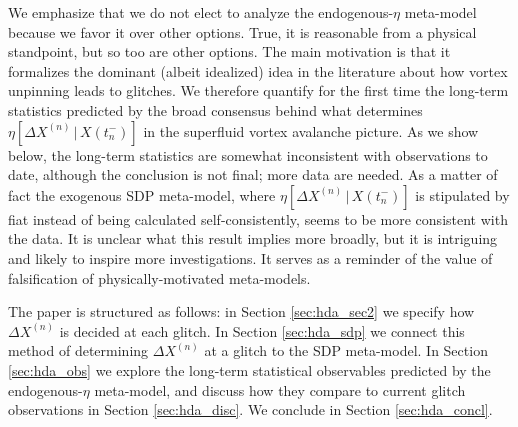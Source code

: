 We emphasize that we do not elect to analyze the endogenous-$\eta$ meta-model because we favor it over other options. True, it is reasonable from a physical standpoint, but so too are other options. The main motivation is that it formalizes the dominant (albeit idealized) idea in the literature about how vortex unpinning leads to glitches. We therefore quantify for the first time the long-term statistics predicted by the broad consensus behind what determines $\eta[\Delta X^{(n)}\,|\,X(t_{n}^-)]$ in the superfluid vortex avalanche picture. As we show below, the long-term statistics are somewhat inconsistent with observations to date, although the conclusion is not final; more data are needed. As a matter of fact the exogenous SDP meta-model, where $\eta[\Delta X^{(n)}\,|\,X(t_{n}^-)]$ is stipulated by fiat instead of being calculated self-consistently, seems to be more consistent with the data. It is unclear what this result implies more broadly, but it is intriguing and likely to inspire more investigations. It serves as a reminder of the value of falsification of physically-motivated meta-models.

The paper is structured as follows: in Section \ref{sec:hda_sec2} we specify how $\Delta X^{(n)}$ is decided at each glitch. In Section \ref{sec:hda_sdp} we connect this method of determining $\Delta X^{(n)}$ at a glitch to the SDP meta-model. In Section \ref{sec:hda_obs} we explore the long-term statistical observables predicted by the endogenous-$\eta$ meta-model, and discuss how they compare to current glitch observations in Section \ref{sec:hda_disc}. We conclude in Section \ref{sec:hda_concl}. 


